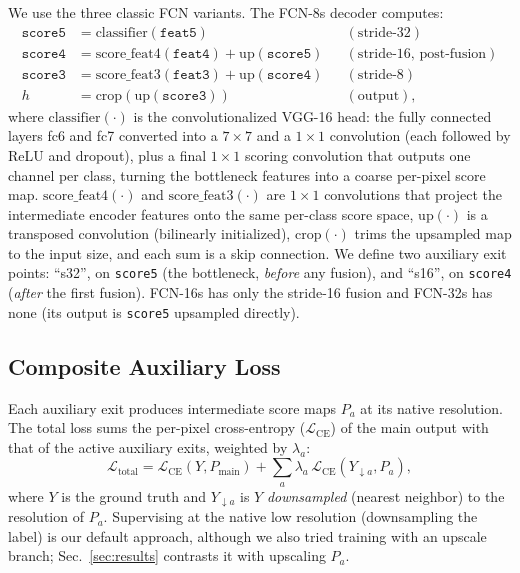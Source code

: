 \documentclass[runningheads]{llncs}
\begin{document}
    We use the three classic FCN variants. The FCN-8s
    decoder computes:
    \begin{align}
    \texttt{score5} &= \mathrm{classifier}(\texttt{feat5}) && (\text{stride-32}) \\
    \texttt{score4} &= \mathrm{score\_feat4}(\texttt{feat4}) + \mathrm{up}(\texttt{score5}) && (\text{stride-16, post-fusion}) \\
    \texttt{score3} &= \mathrm{score\_feat3}(\texttt{feat3}) + \mathrm{up}(\texttt{score4}) && (\text{stride-8}) \\
    h &= \mathrm{crop}(\mathrm{up}(\texttt{score3})) && (\text{output}),
    \end{align}
    where $\mathrm{classifier}(\cdot)$ is the convolutionalized VGG-16 head: the
    fully connected layers fc6 and fc7 converted into a $7{\times}7$ and a
    $1{\times}1$ convolution (each followed by ReLU and dropout), plus a final
    $1{\times}1$ scoring convolution that outputs one channel per class, turning
    the bottleneck features into a coarse per-pixel score map.
    $\mathrm{score\_feat4}(\cdot)$ and $\mathrm{score\_feat3}(\cdot)$ are
    $1{\times}1$ convolutions that project the intermediate encoder features onto
    the same per-class score space, $\mathrm{up}(\cdot)$ is a transposed
    convolution (bilinearly initialized), $\mathrm{crop}(\cdot)$ trims the
    upsampled map to the input size, and each sum is a skip connection.
     We define two auxiliary exit
    points: ``s32'', on \texttt{score5} (the bottleneck, \emph{before} any
    fusion), and ``s16'', on \texttt{score4} (\emph{after} the first fusion).
    FCN-16s has only the stride-16 fusion and FCN-32s has none (its output is
    \texttt{score5} upsampled directly).
    
    \subsection{Composite Auxiliary Loss}
    
    Each auxiliary exit produces intermediate score maps $P_a$ at its native
    resolution. The total loss sums the per-pixel cross-entropy
    ($\mathcal{L}_{\mathrm{CE}}$) of the main output with that of the active
    auxiliary exits, weighted by $\lambda_a$:
    \begin{equation}
    \mathcal{L}_{\mathrm{total}} = \mathcal{L}_{\mathrm{CE}}(Y, P_{\mathrm{main}})
    + \sum_{a} \lambda_a\, \mathcal{L}_{\mathrm{CE}}(Y_{\downarrow a}, P_a),
    \label{eq:loss}
    \end{equation}
    where $Y$ is the ground truth and $Y_{\downarrow a}$ is $Y$ \emph{downsampled}
    (nearest neighbor) to the resolution of $P_a$. Supervising at the native low
    resolution (downsampling the label) is our default approach, although we also tried training with an upscale branch; Sec.~\ref{sec:results} contrasts it with upscaling $P_a$.
\end{document}
